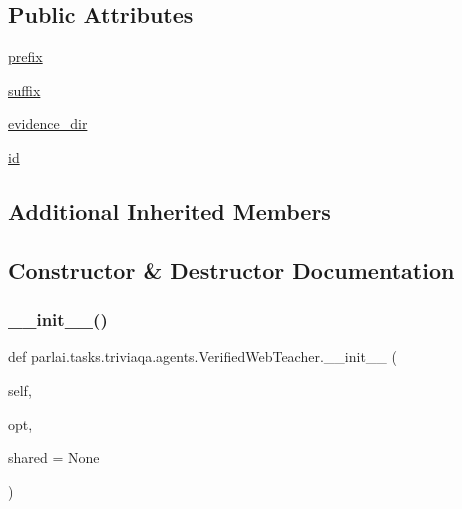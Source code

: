 \subsection*{Public Attributes}
\begin{DoxyCompactItemize}
\item 
\hyperlink{classparlai_1_1tasks_1_1triviaqa_1_1agents_1_1VerifiedWebTeacher_a87ba370cc7703d6d0674576f12bd374d}{prefix}
\item 
\hyperlink{classparlai_1_1tasks_1_1triviaqa_1_1agents_1_1VerifiedWebTeacher_a664ec91ac0757abaaf6853ea939232e4}{suffix}
\item 
\hyperlink{classparlai_1_1tasks_1_1triviaqa_1_1agents_1_1VerifiedWebTeacher_a6c7349009918dcbbfc17f930458e8698}{evidence\+\_\+dir}
\item 
\hyperlink{classparlai_1_1tasks_1_1triviaqa_1_1agents_1_1VerifiedWebTeacher_a482a09c00640e0bc928c2f8f9b1e20a1}{id}
\end{DoxyCompactItemize}
\subsection*{Additional Inherited Members}


\subsection{Constructor \& Destructor Documentation}
\mbox{\label{classparlai_1_1tasks_1_1triviaqa_1_1agents_1_1VerifiedWebTeacher_a24150c529859f238cecd45835b93111a}} 
\subsubsection{\texorpdfstring{\+\_\+\+\_\+init\+\_\+\+\_\+()}{\_\_init\_\_()}}
{\footnotesize\ttfamily def parlai.\+tasks.\+triviaqa.\+agents.\+Verified\+Web\+Teacher.\+\_\+\+\_\+init\+\_\+\+\_\+ (\begin{DoxyParamCaption}\item[{}]{self,  }\item[{}]{opt,  }\item[{}]{shared = {\ttfamily None} }\end{DoxyParamCaption})}



